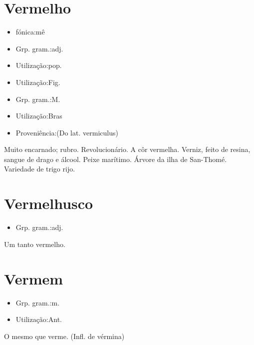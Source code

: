 \documentclass{article}
\begin{document}
\section{Vermelho}
\begin{itemize}
\item {fónica:mê}
\end{itemize}
\begin{itemize}
\item {Grp. gram.:adj.}
\end{itemize}
\begin{itemize}
\item {Utilização:pop.}
\end{itemize}
\begin{itemize}
\item {Utilização:Fig.}
\end{itemize}
\begin{itemize}
\item {Grp. gram.:M.}
\end{itemize}
\begin{itemize}
\item {Utilização:Bras}
\end{itemize}
\begin{itemize}
\item {Proveniência:(Do lat. \textunderscore vermiculus\textunderscore )}
\end{itemize}
Muito encarnado; rubro.
Revolucionário.
A côr vermelha.
Verniz, feito de resina, sangue de drago e álcool.
Peixe marítimo.
Árvore da ilha de San-Thomé.
Variedade de trigo rijo.
\section{Vermelhusco}
\begin{itemize}
\item {Grp. gram.:adj.}
\end{itemize}
Um tanto vermelho.
\section{Vermem}
\begin{itemize}
\item {Grp. gram.:m.}
\end{itemize}
\begin{itemize}
\item {Utilização:Ant.}
\end{itemize}
O mesmo que \textunderscore verme\textunderscore .
(Infl. de \textunderscore vérmina\textunderscore )
\end{document}
